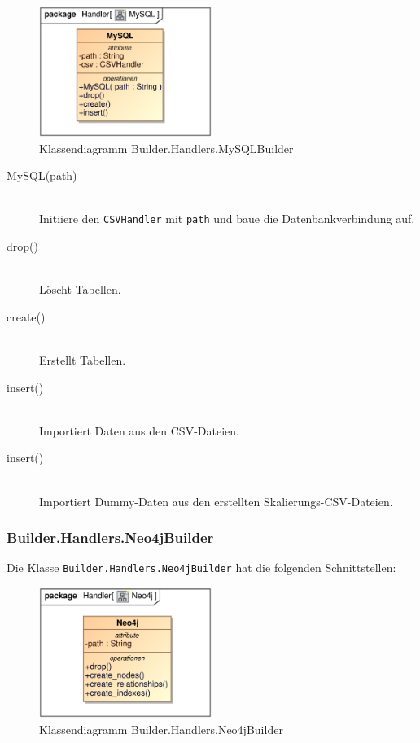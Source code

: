 \begin{figure}[H]
    \myfloatalign
    \includegraphics[width=0.5\textwidth]{gfx/MtGDeepAnalysis/MySQL.eps}
    \caption{Klassendiagramm Builder.Handlers.MySQLBuilder}
    \label{fig:class:builder.handlers.mysqlbuilder}
\end{figure}

\begin{description}
    \item[MySQL(path)] \hfill \\
    Initiiere den \verb|CSVHandler| mit \verb|path| und baue die Datenbankverbindung auf.
    
    \item[drop()] \hfill \\
       Löscht Tabellen.
       
    \item[create()] \hfill \\
        Erstellt Tabellen.
        
    \item[insert()] \hfill \\
        Importiert Daten aus den \ac{CSV}-Dateien.
    
    \item[insert()] \hfill \\
        Importiert Dummy-Daten aus den erstellten Skalierungs-CSV-Dateien.
\end{description}


\subsubsection{Builder.Handlers.Neo4jBuilder}
Die Klasse \verb|Builder.Handlers.Neo4jBuilder| hat die folgenden Schnittstellen:

\begin{figure}[H]
    \myfloatalign
    \includegraphics[width=0.5\textwidth]{gfx/MtGDeepAnalysis/Neo4j.eps}
    \caption{Klassendiagramm Builder.Handlers.Neo4jBuilder}
    \label{fig:class:builder.handlers.neo4jbuilder}
\end{figure}

